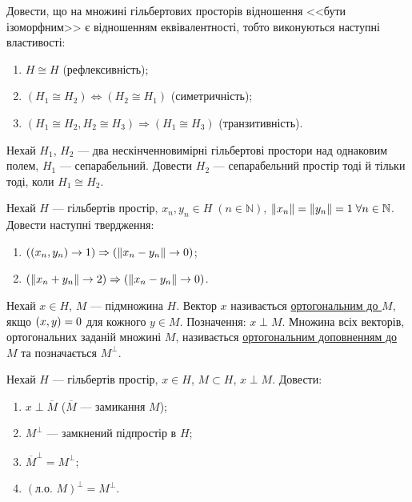 \begin{exercise}
    Довести, що на множині гільбертових просторів відношення <<бути ізоморфним>>
    є відношенням еквівалентності, тобто виконуються наступні властивості:
    \begin{enumerate}[label=\ukr*)]
        \item $H \cong H$ (рефлексивність);
        \item $(H_1 \cong H_2) \Leftrightarrow (H_2 \cong H_1)$ (симетричність);
        \item $(H_1 \cong H_2, H_2 \cong H_3) \Rightarrow (H_1 \cong H_3)$ (транзитивність).
    \end{enumerate}
\end{exercise}

\begin{exercise}\label{N:1_2_8}
    Нехай $H_1$, $H_2$ --- два нескінченновимірні гільбертові простори над однаковим полем, $H_1$ --- сепарабельний.
    Довести $H_2$ --- сепарабельний простір тоді й тільки тоді, коли $H_1 \cong H_2$.
\end{exercise}

\begin{exercise}
    Нехай $H$ --- гільбертів простір, $x_n, y_n \in H \; (n \in \mathbb{N})$, $\left\lVert x_n\right\rVert = \left\lVert y_n\right\rVert = 1 \; \forall n \in \mathbb{N}$.
    Довести наступні твердження:
    \begin{enumerate}[label=\ukr*)]
        \item $(\left(x_n, y_n\right) \rightarrow 1) \Rightarrow (\left\lVert x_n - y_n\right\rVert \rightarrow 0)$;
        \item $(\left\lVert x_n + y_n\right\rVert \rightarrow 2) \Rightarrow (\left\lVert x_n - y_n\right\rVert \rightarrow 0)$.
    \end{enumerate}
\end{exercise}

\begin{theory}
    Нехай $x \in H$, $M$ --- підмножина $H$. Вектор $x$ називається \uline{ортогональним до $M$},
    якщо $\left(x, y\right) = 0$ для кожного $y \in M$. Позначення: $x \perp M$.
    Множина всіх векторів, ортогональних заданій множині $M$, називається \uline{ортогональним доповненням до $M$} 
    та позначається $M^\perp$.
\end{theory}

\begin{exercise}
    Нехай $H$ --- гільбертів простір, $x\in H$, $M \subset H$, $x \perp M$.
    Довести:
    \begin{enumerate}[label=\ukr*)]
        \item $x \perp \overline{M}$ ($\overline{M}$ --- замикання $M$);
        \item $M^\perp$ --- замкнений підпростір в $H$;
        \item $\overline{M}^\perp = M^\perp$;
        \item $(\text{л.о. } M)^\perp = M^\perp$.
    \end{enumerate}
\end{exercise}


